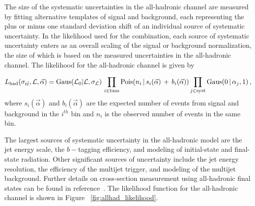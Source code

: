 The size of the systematic uncertainties in the all-hadronic channel are measured by fitting alternative templates of signal and background, 
each representing the plus or minus one standard deviation shift of an individual source of systematic uncertainty.
In the likelihood used for the combination, each source of systematic uncertainty enters as an overall scaling of the signal or background normalization,
the size of which is based on the measured uncertainties in the all-hadronic channel.
The likelihood for the all-hadronic channel is given by

\begin{equation}\label{Eq:dileplikelihood}
  L_{\text{had}}(\sigma_{t\bar{t}}, {\cal L}, \vec{\alpha }) = \text{Gaus}({\cal L}_0 | {\cal L}, \sigma_{\cal L})\, \prod_{i\in \text{bins}} \text{Pois}(n_{i} \,|\, s_{i}(\vec{\alpha}) \,+\, b_{i}(\vec{\alpha}))  \prod_{j\in \text{syst}} \text{Gaus}( 0 \,|\, \alpha_{j}, 1) \,  ,
\end{equation}
where $s_{i}(\vec{\alpha})$ and $b_{i}(\vec{\alpha})$ are the expected number of events from signal and background in the $i^{th}$ bin and $n_{i}$ is the observed number of events in the same bin. 

The largest sources of systematic uncertainty in the all-hadronic model are the jet energy scale, the $b-$tagging efficiency, and modeling of initial-state and final-state radiation.
Other significant sources of uncertainty include the jet energy resolution, the efficiency of the multijet trigger, and modeling of the multijet background.
Further details on cross-section measurement using all-hadronic final states can be found in reference~\cite{ALL_HADRONIC_NOTE}.
The likelihood function for the all-hadronic channel is shown in Figure ~\ref{fig:allhad_likelihood}.

